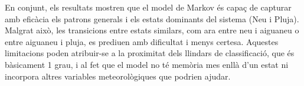 \documentclass[../main.tex]{subfiles}
\begin{document}
En conjunt, els resultats mostren que el model de Markov és capaç de capturar amb eficàcia els patrons generals i els estats dominants del sistema (Neu i Pluja). Malgrat això, les transicions entre estats similars, com ara entre neu i aiguaneu o entre aiguaneu i pluja, es prediuen amb dificultat i menys certesa. Aquestes limitacions poden atribuir-se a la proximitat dels llindars de classificació, que és bàsicament  1 grau, i al fet que el model no té memòria mes enllà d'un estat ni incorpora altres variables meteorològiques que podrien ajudar.

\end{document}
